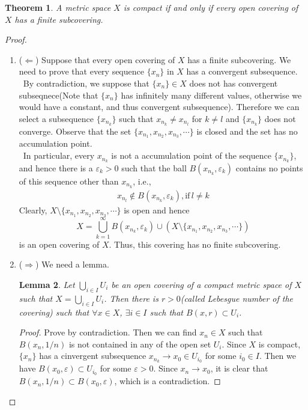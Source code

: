 \documentclass[12pt,leqno]{amsart}
\newtheorem{theorem}{Theorem}[section]
\newtheorem{lemma}[theorem]{Lemma}
\theoremstyle{definition}
\numberwithin{equation}{subsection}
\begin{document}
\begin{theorem}\label{finitcover}
A metric space $X$ is compact if and only if every open covering of $X$ has a finite subcovering.
\end{theorem}
\begin{proof}
~\begin{enumerate}
    \item ($\Leftarrow$) Suppose that every open covering of $X$ has a finite subcovering. We need to prove that every sequence $\{x_n\}$ in $X$ has a convergent subsequence. \\
    \hspace*{1em}\, By contradiction, we suppose that $\{x_n\}\in X$ does not has convergent subseqnece(Note that $\{x_n\}$ has infinitely many different values, otherwise we would have a constant, and thus convergent subsequence). Therefore we can select a subsequence $\{x_{n_k}\}$ such that $x_{n_k} \neq x_{n_l}$ for $k\neq l$ and $\{x_{n_k}\}$ does not converge. Observe that the set $\{x_{n_1},x_{n_2},x_{n_3},\cdots\}$ is closed and the set has no accumulation point.\\
    \hspace*{1em}\, In particular, every $x_{n_k}$ is not a accumulation point of the sequence $\{x_{n_k}\}$, and hence there is a $\varepsilon_k>0$ such that the ball $B(x_{n_k}, \varepsilon_k)$ contains no points of this sequence other than $x_{n_k}$, i.e., 
    \begin{align*}
        x_{n_l}\notin B(x_{n_k}, \varepsilon_k), \text{if}\,l\neq k
    \end{align*}
    Clearly, $X\setminus \{x_{n_1},x_{n_2},x_{n_3},\cdots\}$ is open and hence $$X = \bigcup^\infty_{k=1}B(x_{n_k},\varepsilon_k) \cup \left(X\setminus \{x_{n_1},x_{n_2},x_{n_3},\cdots\}\right)$$ 
    is an open covering of $X$. Thus, this covering has no finite subcovering.
    \item ($\Rightarrow$) We need a lemma.
    \begin{lemma}
    Let $\bigcup_{i\in I}U_i$ be an open covering of a compact metric space of $X$ such that $X = \bigcup_{i\in I}U_i$. Then there is $r>0$(called Lebesgue number of the covering) such that $\forall x\in X$, $\exists i\in I$ such that $B(x,r)\subset U_i$.
    \end{lemma}
    \begin{proof}
    Prove by contradiction. Then we can find $x_n\in X$ such that $B(x_n,1/n)$ is not contained in any of the open set $U_i$. Since $X$ is compact, $\{x_n\}$ has a cinvergent subsequence $x_{n_k}\to x_0\in U_{i_0}$ for some $i_0\in I$. Then we have $B(x_0, \varepsilon)\subset U_{i_0}$ for some $\varepsilon>0$. Since $x_n\to x_0$, it is clear that $B(x_n,1/n)\subset B(x_0, \varepsilon)$, which is a contradiction.

\end{proof}
\end{enumerate}
\end{proof}
\end{document}
